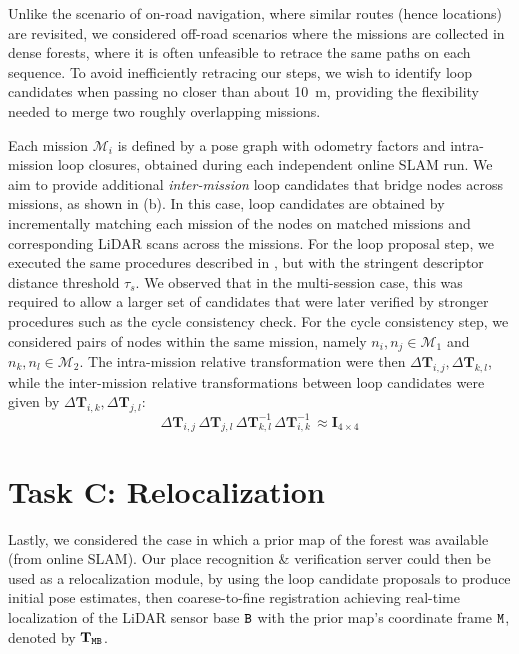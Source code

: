 Unlike the scenario of on-road navigation, where similar routes (hence locations) are revisited, we considered off-road scenarios where the missions are collected in dense forests, where it is often unfeasible to retrace the same paths on each sequence. To avoid inefficiently retracing our steps, we wish to identify loop candidates when passing no closer than about \SI{10}{\meter}, providing the flexibility needed to merge two roughly overlapping missions.

Each mission ${\mathcal{M}_{i}}$ is defined by a pose graph with odometry factors and intra-mission loop closures, obtained during each independent online SLAM run. We aim to provide additional \emph{inter-mission} loop candidates that bridge nodes across missions, as shown in  (b). In this case, loop candidates are obtained by incrementally matching each mission of the nodes on matched missions and corresponding LiDAR scans across the missions.
For the loop proposal step, we executed the same procedures described in , but with the stringent descriptor distance threshold $\tau_{s}$. We observed that in the multi-session case, this was required to allow a larger set of candidates that were later verified by stronger procedures such as the cycle consistency check. 
For the cycle consistency step, we considered pairs of nodes within the same mission, namely $n_i, n_j \in \mathcal{M}_1$ and $n_k, n_l \in \mathcal{M}_2$. The intra-mission relative transformation were then $\Delta\mathbf{T}_{i,j}, \Delta\mathbf{T}_{k, l}$, while the inter-mission relative transformations between loop candidates were given by $\Delta\mathbf{T}_{i,k}, \Delta\mathbf{T}_{j,l}$:
\begin{equation}
  \label{eq:cycle-offline}
  \Delta\mathbf{T}_{i,j}\, \Delta\mathbf{T}_{j,l}\, \Delta\mathbf{T}_{k, l}^{-1}\, \Delta\mathbf{T}_{i,k}^{-1}\, \approx \mathbf{I}_{4\times4}
\end{equation}

\section{Task C: Relocalization} \label{sec:relocalization}
Lastly, we considered the case in which a prior map of the forest was available (from online SLAM). Our place recognition \& verification server could then be used as a relocalization module, by using the loop candidate proposals to produce initial pose estimates, then coarese-to-fine registration achieving real-time localization of the LiDAR sensor base $\mathtt{B}$ with the prior map's coordinate frame $\mathtt{M}$, denoted by $\mathbf{T}_{\mathtt{M}\mathtt{B}}$.

